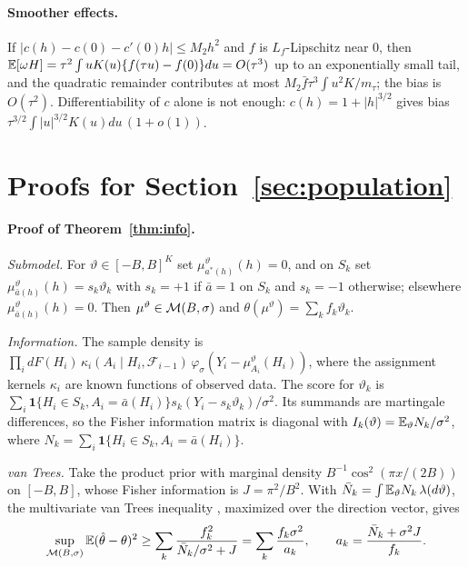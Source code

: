 \paragraph{Smoother effects.} If $|c(h)-c(0)-c'(0)h|\le M_2h^2$ and $f$ is
$L_f$-Lipschitz near $0$, then
$\mathbb{E}[\omega H]=\tau^2\int uK(u)\{f(\tau u)-f(0)\}du=O(\tau^3)$ up to an
exponentially small tail, and the quadratic remainder contributes at most
$M_2\bar f\tau^3\int u^2K/m_\tau$; the bias is $O(\tau^2)$. Differentiability of
$c$ alone is not enough: $c(h)=1+|h|^{3/2}$ gives bias
$\tau^{3/2}\int|u|^{3/2}K(u)du\,(1+o(1))$.

\section{Proofs for Section~\ref{sec:population}}\label{app:population}

\paragraph{Proof of Theorem~\ref{thm:info}.}
\emph{Submodel.} For $\vartheta\in[-B,B]^K$ set $\mu^\vartheta_{a^*(h)}(h)=0$,
and on $S_k$ set $\mu^\vartheta_{\bar a(h)}(h)=s_k\vartheta_k$ with $s_k=+1$ if
$\bar a=1$ on $S_k$ and $s_k=-1$ otherwise; elsewhere
$\mu^\vartheta_{\bar a(h)}(h)=0$. Then $\mu^\vartheta\in\mathcal{M}(B,\sigma)$ and
$\theta(\mu^\vartheta)=\sum_kf_k\vartheta_k$.

\emph{Information.} The sample density is
$\prod_idF(H_i)\,\kappa_i(A_i\mid H_i,\mathcal F_{i-1})\,\varphi_\sigma(Y_i-\mu^\vartheta_{A_i}(H_i))$,
where the assignment kernels $\kappa_i$ are known functions of observed data.
The score for $\vartheta_k$ is
$\sum_i\mathbf 1\{H_i\in S_k,A_i=\bar a(H_i)\}s_k(Y_i-s_k\vartheta_k)/\sigma^2$.
Its summands are martingale differences, so the Fisher information matrix is
diagonal with $I_k(\vartheta)=\mathbb{E}_\vartheta N_k/\sigma^2$, where
$N_k=\sum_i\mathbf 1\{H_i\in S_k,A_i=\bar a(H_i)\}$.

\emph{van Trees.} Take the product prior with marginal density
$B^{-1}\cos^2(\pi x/(2B))$ on $[-B,B]$, whose Fisher information is $J=\pi^2/B^2$.
With $\bar N_k=\int\mathbb{E}_\vartheta N_k\,\lambda(d\vartheta)$, the multivariate van
Trees inequality \cite{gill1995applications}, maximized over the direction
vector, gives
\[
\sup_{\mathcal{M}(B,\sigma)}\mathbb{E}(\hat\theta-\theta)^2\ge\sum_k\frac{f_k^2}{\bar N_k/\sigma^2+J}=\sum_k\frac{f_k\sigma^2}{a_k},
\qquad a_k=\frac{\bar N_k+\sigma^2J}{f_k}.
\]

